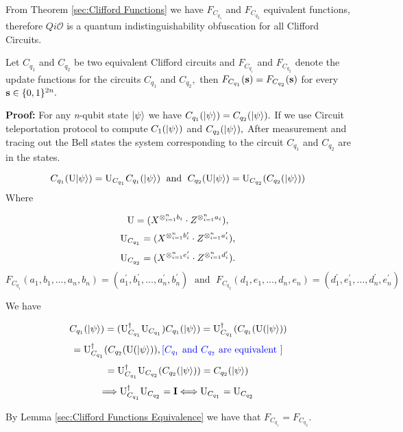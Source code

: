 From Theorem \ref{sec:Clifford Functions} we have $F_{C_{q_1}}$ and $F_{C_{q_2}}$ equivalent functions, therefore $Qi\mathcal{O}$ is a quantum indistinguishability obfuscation for all Clifford Circuits.

\begin{theorem}\label{sec:Clifford Functions}
Let $C_{q_1}$ and $C_{q_2}$ be two equivalent Clifford circuits and  $F_{C_{q_1}}$ and $F_{C_{q_2}}$  denote the update functions for the circuits $C_{q_1}$ and $C_{q_2},$ then $F_{C_{q_1}}({\bf s})=F_{C_{q_2}}({\bf s})$ for every ${\bf s}\in\{0,1\}^{2n}.$
\end{theorem}


\begin{flushleft}
{\bf Proof:} For any {\em n}-qubit state ${\lvert}\psi\rangle$ we have $C_{q_1}({\lvert}\psi\rangle)=C_{q_2}({\lvert}\psi\rangle).$ If we use Circuit teleportation protocol to compute $C_1({\lvert}\psi\rangle)$ and $C_{q_2}({\lvert}\psi\rangle),$ After measurement and tracing out the Bell states  the system corresponding to the circuit $C_{q_1}$ and $C_{q_2}$ are in the states.

$$C_{q_1} ({\rm {\rm U}}{\lvert}\psi\rangle)={\rm {\rm U}}_{C_{q_1}}C_{q_1}({\lvert}\psi\rangle)  \;\mbox{ and }\; C_{q_2} ({\rm {\rm U}}{\lvert}\psi\rangle)={\rm {\rm U}}_{C_{q_2}}(C_{q_2}({\lvert}\psi\rangle))$$
Where

 $${\rm {\rm U}}=( X^{\otimes_{i=1}^{n} b_{i}} \cdot Z^{\otimes_{i=1}^{n} a_{i}}),$$
$${\rm {\rm U}}_{C_{q_1}}=(X^{\otimes_{i=1}^{n} b^\prime_{i}} \cdot Z^{\otimes_{i=1}^{n} a^\prime_{i}}),$$
$${\rm {\rm U}}_{C_{q_2}}=(X^{\otimes_{i=1}^{n} e^\prime_{i}} \cdot Z^{\otimes_{i=1}^{n} d^\prime_{i}}).$$
$$F_{C_{q_1}}(a_1,b_1,\ldots, a_n,b_n)=(a^\prime_1,b^\prime_1,\ldots, a^\prime_n,b^\prime_n) \;\mbox{ and }\; F_{C_{q_2}}(d_1,e_1,\ldots, d_n,e_n)=(d_1^\prime,e_1^\prime,\ldots, d_n^\prime,e^\prime_n)$$

We have

$$C_{q_1}({\lvert}\psi\rangle)=({\rm {\rm U}}_{C_{q_1}}^\dagger {\rm {\rm U}}_{C_{q_1}})C_{q_1}({\lvert}\psi\rangle)={\rm {\rm U}}_{C_{q_1}}^\dagger ( C_{q_1}({\rm {\rm U}}({\lvert}\psi\rangle))$$
$$={\rm {\rm U}}_{C_{q_1}}^\dagger ( C_{q_2}({\rm {\rm U}}({\lvert}\psi\rangle)),  {\color{blue}[C_{q_1} \mbox{ and } C_{q_2} \mbox{ are equivalent } ]}$$
$$={\rm {\rm U}}_{C_{q_1}}^\dagger {\rm {\rm U}}_{C_{q_2}}(C_{q_2}({\lvert}\psi\rangle))=C_{q_2}({\lvert}\psi\rangle)$$
$$\Longrightarrow {\rm {\rm U}}_{C_{q_1}}^\dagger {\rm {\rm U}}_{C_{q_2}}={\bf I}\Longleftrightarrow {\rm {\rm U}}_{C_{q_1}}={\rm {\rm U}}_{C_{q_2}}$$


By Lemma \ref{sec:Clifford Functions Equivalence}  we have that $F_{C_{q_1}}=F_{C_{q_2}}.$
\end{flushleft}

